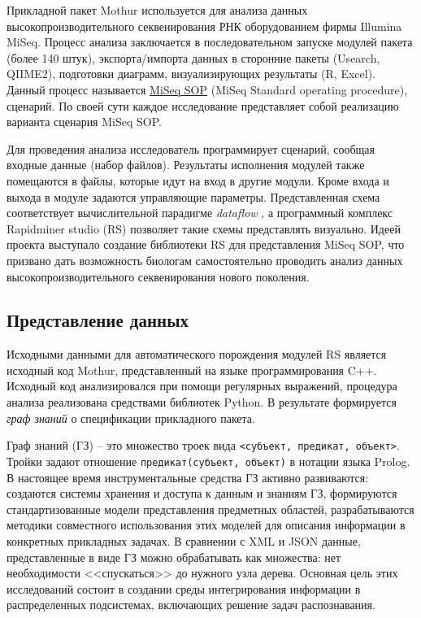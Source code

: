 \documentclass[12pt]{article}
\begin{document}
Прикладной пакет Mothur используется для анализа данных высокопроизводительного секвенирования РНК оборудованием фирмы Illumina MiSeq.  Процесс анализа заключается в последовательном запуске модулей пакета (более 140 штук), экспорта/импорта данных в сторонние пакеты (Usearch, QIIME2), подготовки диаграмм, визуализирующих результаты (R, Excel).  Данный процесс называется \href{https://mothur.org/wiki/miseq_sop/}{MiSeq SOP} (MiSeq Standard operating procedure), сценарий.  По своей сути каждое исследование представляет собой реализацию варианта сценария MiSeq SOP.

Для проведения анализа исследователь программирует сценарий, сообщая входные данные (набор файлов).  Результаты исполнения модулей также помещаются в файлы, которые идут на вход в другие модули.  Кроме входа и выхода в модуле задаются управляющие параметры.  Представленная схема соответствует вычислительной парадигме \emph{dataflow} \cite{dataflow}, а программный комплекс Rapidminer studio (RS) позволяет такие схемы представлять визуально.  Идеей проекта \cite{zont19} выступало создание библиотеки RS для представления MiSeq SOP, что призвано дать возможность биологам самостоятельно проводить анализ данных высокопроизводительного секвенирования нового поколения.

\subsection{Представление данных}

Исходными данными для автоматического порождения модулей RS является исходный код Mothur, представленный на языке программирования C++.  Исходный код анализировался при помощи регулярных выражений, процедура анализа реализована средствами библиотек Python.  В результате формируется \emph{граф знаний} \cite{kg} о спецификации прикладного пакета.

Граф знаний (ГЗ) -- это множество троек вида \texttt{<субъект, предикат, объект>}.  Тройки задают отношение \texttt{предикат(субъект, объект)} в нотации языка Prolog.  В настоящее время инструментальные средства ГЗ активно развиваются: создаются системы хранения и доступа к данным и знаниям ГЗ, формируются стандартизованные модели представления предметных областей, разрабатываются методики совместного использования этих моделей для описания информации в конкретных прикладных задачах.  В сравнении с XML и JSON данные, представленные в виде ГЗ можно обрабатывать как множества: нет необходимости <<спускаться>> до нужного узла дерева.  Основная цель этих исследований состоит в создании среды интегрирования информации в распределенных подсистемах, включающих решение задач распознавания.
\end{document}
